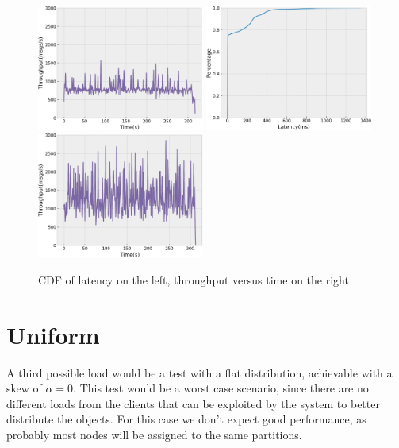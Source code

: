 \begin{figure}[H]
  \includegraphics[width=0.49\textwidth,height=\textheight,keepaspectratio]{img/global5_tp.png}
  \includegraphics[width=0.49\textwidth,height=\textheight,keepaspectratio]{img/global1_lat.png}
  \includegraphics[width=0.49\textwidth,height=\textheight,keepaspectratio]{img/global1_tp.png}
  \caption{ CDF of latency on the left, throughput versus time on the right }
  \label{fig:global50-performance}
\end{figure}

\section{Uniform}\label{sec:uniform}
A third possible load would be a test with a flat distribution, achievable with a skew of $\alpha = 0$. This test would be a worst case scenario, since there are no different loads from the clients that can be exploited by the system to better distribute the objects. For this case we don't expect good performance, as probably most nodes will be assigned to the same partitions.

